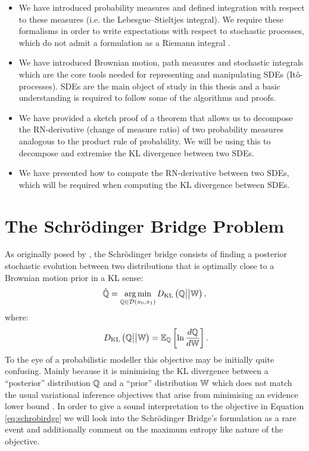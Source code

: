 \documentclass[a4paper,12pt,twoside,openright]{report}
\theoremstyle{definition}
\begin{document}
\begin{itemize}
    \item We have introduced probability measures and defined integration with respect to these measures (i.e. the Lebesgue–Stieltjes integral). We require these formalisms in order to write expectations with respect to stochastic processes, which do not admit a formulation as a Riemann integral .
    \item We have introduced Brownian motion, path measures and stochastic integrals which are the core tools needed for representing and manipulating SDEs (Itô-processes). SDEs are the main object of study in this thesis and a basic understanding is required to follow some of the algorithms and proofs.
    \item We have provided a sketch proof of a theorem that allows us to decompose the RN-derivative (change of measure ratio) of two probability measures analogous to the product rule of probability. We will be using this to decompose and extremise the KL divergence between two SDEs. 
    \item We have presented how to compute the RN-derivative between two SDEs, which will be required when computing the KL divergence between SDEs.
\end{itemize}
\chapter{The Schrödinger Bridge Problem}

As originally posed by \citet{schrodinger1931uber, schrodinger1932theorie}, the Schrödinger bridge consists of finding a posterior stochastic evolution between two distributions that is optimally close to a Brownian motion prior in a KL sense:
\begin{align} \label{eq:schrobirdge}
    \hat{{\mathbb{Q}}}= \operatorname*{arg\,min}_{{\mathbb{Q}} \in {\mathcal{D}}(\pi_0, \pi_1)} D_{\mathrm{KL}}\left({\mathbb{Q}} \big|\big| \mathbb{W}\right),
\end{align}
where:
\begin{align} \label{eq:kl_sho}
    \ D_{\mathrm{KL}}\left({\mathbb{Q}} \big|\big| \mathbb{W}\right) = \mathbb{E}_{{\mathbb{Q}}}\left[\ln \frac{d{\mathbb{Q}}}{d\mathbb{W}}\right].
\end{align}
To the eye of a probabilistic modeller this objective may be initially quite confusing.  Mainly because it is minimising the KL divergence between a ``posterior'' distribution ${\mathbb{Q}}$ and a ``prior'' distribution $\mathbb{W}$ which does not match the usual variational inference objectives that arise from minimising an evidence lower bound \citep{yang2017understanding}. In order to give a sound interpretation to the objective in Equation \ref{eq:schrobirdge} we will look into the Schrödinger Bridge's formulation as a rare event and additionally comment on the maximum entropy like nature of the objective.
\end{document}
